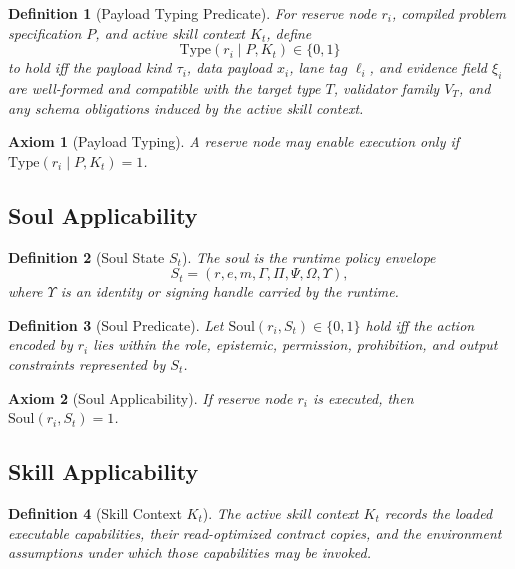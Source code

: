 \documentclass[11pt]{article}
\newtheorem{definition}{Definition}[section]
\newtheorem{axiom}{Axiom}[section]
\theoremstyle{remark}
\newcommand{\Type}{\mathrm{Type}}
\newcommand{\Soul}{\mathrm{Soul}}
\begin{document}
\begin{definition}[Payload Typing Predicate]
For reserve node \(r_i\), compiled problem specification \(P\), and active skill context \(K_t\), define
\[
\Type(r_i \mid P,K_t)\in\{0,1\}
\]
to hold iff the payload kind \(\tau_i\), data payload \(x_i\), lane tag \(\ell_i\), and evidence field \(\xi_i\) are well-formed and compatible with the target type \(T\), validator family \(V_T\), and any schema obligations induced by the active skill context.
\end{definition}

\begin{axiom}[Payload Typing]\label{ax:payload-typing}
A reserve node may enable execution only if \(\Type(r_i \mid P,K_t)=1\).
\end{axiom}

\subsection{Soul Applicability}
\begin{definition}[Soul State $S_t$]
The soul is the runtime policy envelope
\[
S_t=(r,e,m,\Gamma,\Pi,\Psi,\Omega, \Upsilon),
\]
where \(\Upsilon\) is an identity or signing handle carried by the runtime.
\end{definition}

\begin{definition}[Soul Predicate]
Let \(\Soul(r_i,S_t)\in\{0,1\}\) hold iff the action encoded by \(r_i\) lies within the role, epistemic, permission, prohibition, and output constraints represented by \(S_t\).
\end{definition}

\begin{axiom}[Soul Applicability]\label{ax:soul-applicability}
If reserve node \(r_i\) is executed, then \(\Soul(r_i,S_t)=1\).
\end{axiom}

\subsection{Skill Applicability}

\begin{definition}[Skill Context \(K_t\)]
The active skill context \(K_t\) records the loaded executable capabilities, their read-optimized contract copies, and the environment assumptions under which those capabilities may be invoked.
\end{definition}
\end{document}
